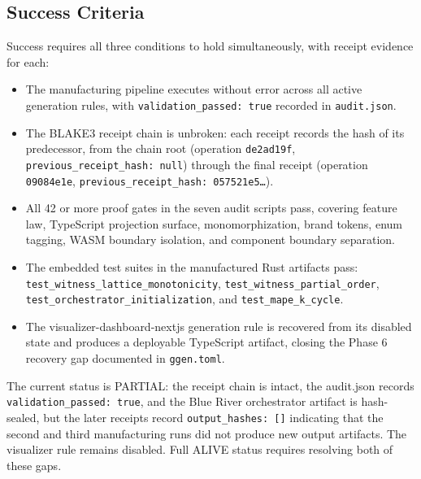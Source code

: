 \subsection{Success Criteria}
\label{sec:ggen-rq-success}

Success requires all three conditions to hold simultaneously, with receipt evidence for each:

\begin{itemize}
  \item The manufacturing pipeline executes without error across all active generation rules, with
    \texttt{validation\_passed: true} recorded in \texttt{audit.json}.
  \item The BLAKE3 receipt chain is unbroken: each receipt records the hash of its predecessor,
    from the chain root (operation \texttt{de2ad19f}, \texttt{previous\_receipt\_hash: null})
    through the final receipt (operation \texttt{09084e1e},
    \texttt{previous\_receipt\_hash: 057521e5\ldots}).
  \item All 42 or more proof gates in the seven audit scripts pass, covering feature law,
    TypeScript projection surface, monomorphization, brand tokens, enum tagging, WASM boundary
    isolation, and component boundary separation.
  \item The embedded test suites in the manufactured Rust artifacts pass: \texttt{test\_witness\_lattice\_monotonicity},
    \texttt{test\_witness\_partial\_order}, \texttt{test\_orchestrator\_initialization}, and
    \texttt{test\_mape\_k\_cycle}.
  \item The visualizer-dashboard-nextjs generation rule is recovered from its disabled state and
    produces a deployable TypeScript artifact, closing the Phase 6 recovery gap documented in
    \texttt{ggen.toml}.
\end{itemize}

The current status is PARTIAL: the receipt chain is intact, the audit.json records
\texttt{validation\_passed: true}, and the Blue River orchestrator artifact is hash-sealed, but
the later receipts record \texttt{output\_hashes: []} indicating that the second and third
manufacturing runs did not produce new output artifacts. The visualizer rule remains disabled.
Full ALIVE status requires resolving both of these gaps.
